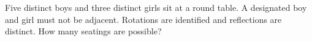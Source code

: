 Five distinct boys and three distinct girls sit at a round table. A designated boy and girl must not be adjacent. Rotations are identified and reflections are distinct. How many seatings are possible?
